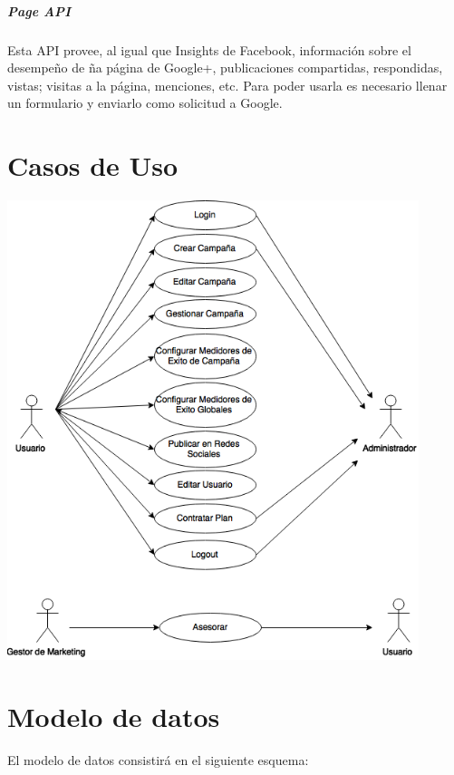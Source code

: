 \documentclass[oneside]{book}
\begin{document}
	\subparagraph*{Page API}
	Esta API provee, al igual que Insights de Facebook, informaci\'{o}n sobre el desempe\~{n}o de ña p\'{a}gina de Google+, publicaciones compartidas, respondidas, vistas; visitas a la p\'{a}gina, menciones, etc. 
	Para poder usarla es necesario llenar un formulario y enviarlo como solicitud a Google.  




\newpage


\section{Casos de Uso}

\includegraphics[width=0.9\textwidth]{images/casosDeUso.png}

\newpage



\section{Modelo de datos}

El modelo de datos consistir\'{a} en el siguiente esquema:
	
\end{document}
